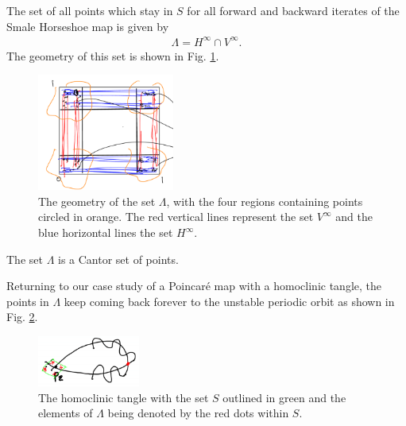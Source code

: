 \begin{definition}
	The set of all points which stay in $S$ for all forward and backward iterates of the Smale Horseshoe map  is given by
	 \begin{align}
		\boxed{
\Lambda = H^{\infty } \cap V^{\infty }.
		}
	\end{align}
	The geometry of this set is shown in Fig. \ref{fig:lambda_def}.
	\begin{figure}[h!]
		\centering
		\includegraphics[width=0.4\textwidth]{figures/ch6/19lambda_def.png}
		\caption{The geometry of the set $\Lambda$, with the four regions containing points circled in orange. The red vertical lines represent the set $V^{\infty }$ and the blue horizontal lines the set $H^{\infty }$.}
		\label{fig:lambda_def}
	\end{figure}
\end{definition}

\begin{remark}[]
The set $\Lambda$ is a Cantor set of points.
\end{remark}

Returning to our case study of a Poincaré map with a homoclinic tangle, the points in $\Lambda$ keep coming back forever to the unstable periodic orbit as shown in Fig. \ref{fig:returning_points}. 
\begin{figure}[h!]
	\centering
	\includegraphics[width=0.3\textwidth]{figures/ch6/20returning_points.png}
	\caption{The homoclinic tangle with the set $S$ outlined in green and the elements of $\Lambda$ being denoted by the red dots within $S$.}
	\label{fig:returning_points}
\end{figure}

